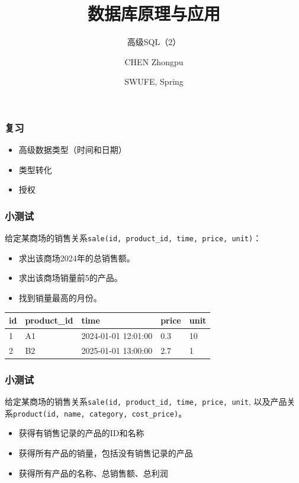 \documentclass[aspectratio=169, 14pt]{beamer}
\title[Database Principles and Applications] %
{数据库原理与应用}
\subtitle{高级SQL（2）}
\author[CHEN Zhongpu] %
{CHEN Zhongpu}
\institute[] %
{
  School of Computing and Artificial Intelligence \\
  \href{mailto:zpchen@swufe.edu.cn}{zpchen@swufe.edu.cn}
}
\date[] %
{SWUFE, Spring \the\year{}}
\begin{document}
\frame{\titlepage}


\begin{frame}
	\frametitle{复习}
	\begin{itemize}
		\item 高级数据类型（时间和日期）
		\item 类型转化
		\item 授权
	\end{itemize}

\end{frame}
\begin{frame}
	\frametitle{小测试}
	给定某商场的销售关系\texttt{sale(id, product\_id, time, price, unit)}：
	\begin{itemize}
		\item 求出该商场2024年的总销售额。
		\item 求出该商场销量前5的产品。
		\item 找到销量最高的月份。
	\end{itemize}
	\begin{table}
		\begin{tabular}{lllll}
			\toprule
			id & product\_id & time                & price & unit \\
			\midrule
			1  & A1          & 2024-01-01 12:01:00 & 0.3   & 10   \\
			2  & B2          & 2025-01-01 13:00:00 & 2.7   & 1    \\
			\bottomrule
		\end{tabular}
	\end{table}
\end{frame}

\begin{frame}
	\frametitle{小测试}
	给定某商场的销售关系\texttt{sale(id, product\_id, time, price, unit}, 以及产品关系\texttt{product(id, name, category, cost\_price)}。

	\begin{itemize}
		\item 获得有销售记录的产品的ID和名称
		\item 获得所有产品的销量，包括没有销售记录的产品
		\item 获得所有产品的名称、总销售额、总利润
	\end{itemize}
\end{frame}
\end{document}
